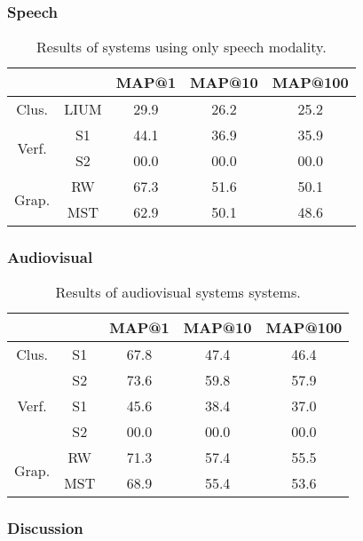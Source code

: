 \subsubsection{Speech}

\begin{table}[tb]
\centering
\begin{tabular}{|c|c|c|c|c|}
\cline{3-5}
 \multicolumn{2}{c|}{ }	& MAP@1 & MAP@10 & MAP@100  \\ \hline
 \multirow{1}{*}{Clus.} & LIUM	& 29.9   & 26.2   & 25.2 \\ \cline{1-5}

 \multirow{2}{*}{Verf.} & S1	& 44.1   & 36.9   & 35.9 \\ \cline{2-5}
 						& S2 	& 00.0   & 00.0   & 00.0 \\ \hline

 \multirow{2}{*}{Grap.} & RW 	& 67.3 	 &  51.6  & 50.1 \\ \cline{2-5}
 						& MST 	& 62.9   &  50.1  & 48.6 \\ \hline 								
\end{tabular}
\vspace*{-2mm}
\caption{Results of systems using only speech modality.}
\vspace*{-2mm}
\label{tab:speech_result}
\end{table}

\subsubsection{Audiovisual}

\begin{table}[tb]
\centering
\begin{tabular}{|c|c|c|c|c|}
\cline{3-5}
 \multicolumn{2}{c|}{ }	& MAP@1 & MAP@10 & MAP@100  \\ \hline
 \multirow{1}{*}{Clus.} & S1	& 67.8   & 47.4   & 46.4 \\ \cline{2-5}
 						& S2 	& 73.6   & 59.8   & 57.9 \\ \hline
 						
 \multirow{1}{*}{Verf.} & S1	& 45.6   & 38.4   & 37.0\\ \cline{2-5}
 						& S2 	& 00.0   & 00.0   & 00.0 \\ \hline

 \multirow{2}{*}{Grap.} & RW 	& 71.3   &  57.4  & 55.5 \\ \cline{2-5}
 						& MST 	& 68.9   &  55.4  & 53.6 \\ \hline 								
\end{tabular}
\vspace*{-2mm}
\caption{Results of audiovisual systems systems.}
\vspace*{-2mm}
\label{tab:av_result}
\end{table}

\subsubsection{Discussion}

\endinput
